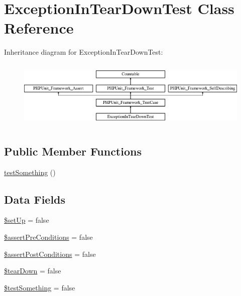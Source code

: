 \hypertarget{class_exception_in_tear_down_test}{}\section{Exception\+In\+Tear\+Down\+Test Class Reference}
\label{class_exception_in_tear_down_test}
Inheritance diagram for Exception\+In\+Tear\+Down\+Test\+:\begin{figure}[H]
\begin{center}
\leavevmode
\includegraphics[height=3.303835cm]{class_exception_in_tear_down_test}
\end{center}
\end{figure}
\subsection*{Public Member Functions}
\begin{DoxyCompactItemize}
\item 
\mbox{\hyperlink{class_exception_in_tear_down_test_a0fc4e17369bc9607ebdd850d9eda8167}{test\+Something}} ()
\end{DoxyCompactItemize}
\subsection*{Data Fields}
\begin{DoxyCompactItemize}
\item 
\mbox{\hyperlink{class_exception_in_tear_down_test_aed7dec37f7cfd2a33216b3f81ebaeb8e}{\$set\+Up}} = false
\item 
\mbox{\hyperlink{class_exception_in_tear_down_test_af1c82be5eeeef75035a066c7cc2eb172}{\$assert\+Pre\+Conditions}} = false
\item 
\mbox{\hyperlink{class_exception_in_tear_down_test_ae16868ae0cb9f100fb80bf4987de5a85}{\$assert\+Post\+Conditions}} = false
\item 
\mbox{\hyperlink{class_exception_in_tear_down_test_a9639b8e6f680299142ffe313f876712f}{\$tear\+Down}} = false
\item 
\mbox{\hyperlink{class_exception_in_tear_down_test_a25acbdb5bf8dc30b31f537d60bfb02f5}{\$test\+Something}} = false
\end{DoxyCompactItemize}
